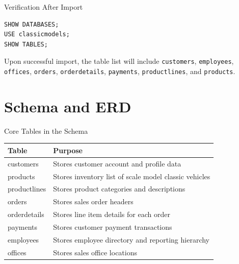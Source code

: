\documentclass[aspectratio=169,professionalfonts]{beamer}
\newcommand{\code}[1]{\texttt{#1}}
\begin{document}
\begin{frame}[fragile]{Verification After Import}
\begin{lstlisting}[style=sqlstyle]
SHOW DATABASES;
USE classicmodels;
SHOW TABLES;
\end{lstlisting}
\vspace{0.4em}
Upon successful import, the table list will include \code{customers}, \code{employees}, \code{offices}, \code{orders}, \code{orderdetails}, \code{payments}, \code{productlines}, and \code{products}.
\end{frame}

\section{Schema and ERD}

\begin{frame}{Core Tables in the Schema}
\small
\begin{tabularx}{\textwidth}{>{\ttfamily}l X}
\toprule
Table & Purpose \\
\midrule
customers & Stores customer account and profile data \\
products & Stores inventory list of scale model classic vehicles \\
productlines & Stores product categories and descriptions \\
orders & Stores sales order headers \\
orderdetails & Stores line item details for each order \\
payments & Stores customer payment transactions \\
employees & Stores employee directory and reporting hierarchy \\
offices & Stores sales office locations \\
\bottomrule
\end{tabularx}
\end{frame}
\end{document}

